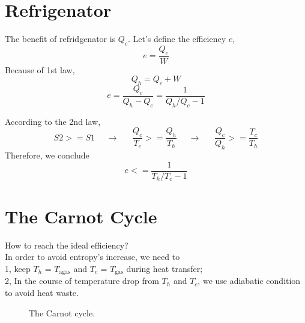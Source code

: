 \documentclass[twoside]{article}
\begin{document}
\section{Refrigenator}
The benefit of refridgenator is $Q_c$. Let's define the efficiency $e$,
\begin{equation} e = \frac{Q_c}{W} \end{equation}
Because of 1st law,
\begin{equation} Q_h = Q_c + W \end{equation}
\begin{equation} e = \frac{Q_c}{Q_h-Q_c} = \frac{1}{Q_h/Q_c-1} \end{equation}

According to the 2nd law,
\begin{equation}    S2 >= S1              ~~~~~~\rightarrow~~~~~~~ 
       \frac{Q_c}{T_c} >= \frac{Q_h}{T_h} ~~~~~~\rightarrow~~~~~~~
       \frac{Q_c}{Q_h} >= \frac{T_c}{T_h} 
\end{equation}
Therefore, we conclude
\begin{equation} e<=\frac{1}{T_h/T_c-1} \end{equation}

\section{The Carnot Cycle}
How to reach the ideal efficiency?\\
In order to avoid entropy's increase, we need to \\
1, keep $T_h$ = $T_\text{agas}$ and $T_c$ = $T_\text{gas}$ during heat transfer;\\
2, In the course of temperature drop from $T_h$ and $T_c$, we use adiabatic condition to avoid heat waste.
\begin{figure}[ht]
\centering
{}
\caption{The Carnot cycle.}
\end{figure}
\end{document}
